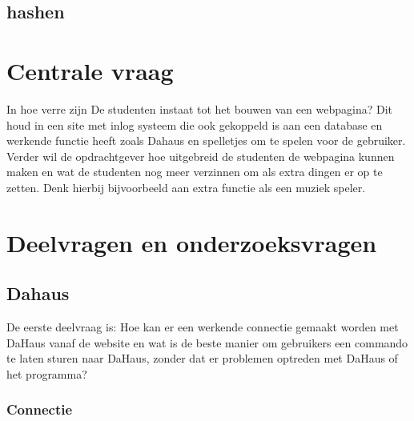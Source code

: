 \documentclass[11pt]{article}
\begin{document}
	\subsection{hashen}
	
	
	\newpage
	
	\section{Centrale vraag}
	In hoe verre zijn De studenten instaat tot het bouwen van een webpagina? Dit houd in een site met inlog systeem die ook gekoppeld is aan een database en werkende functie heeft zoals Dahaus en spelletjes om te spelen voor de gebruiker. Verder wil de opdrachtgever hoe uitgebreid de studenten de webpagina kunnen maken en wat de studenten nog meer verzinnen om als extra dingen er op te zetten. Denk hierbij bijvoorbeeld aan extra functie als een muziek speler. 
	
	\newpage
	
	\section{Deelvragen en onderzoeksvragen}
	\subsection{Dahaus}
	De eerste deelvraag is: Hoe kan er een werkende connectie gemaakt worden met DaHaus vanaf de website en wat is de beste manier om gebruikers een commando te laten sturen naar DaHaus, zonder dat er problemen optreden met DaHaus of het programma? 
	\subsubsection{Connectie}
	
\end{document}
